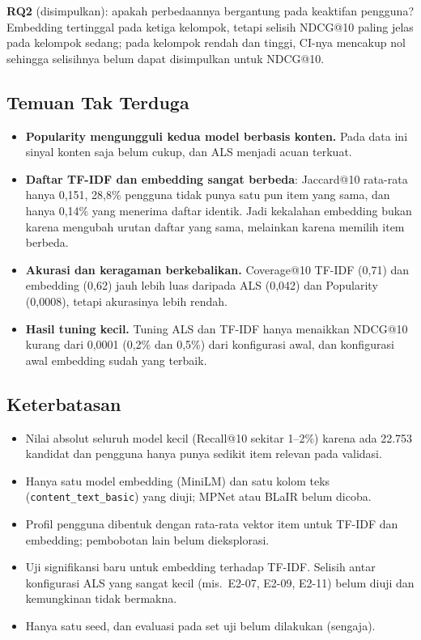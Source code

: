 \textbf{RQ2} (disimpulkan): apakah perbedaannya bergantung pada keaktifan
pengguna? Embedding tertinggal pada ketiga kelompok, tetapi selisih NDCG@10
paling jelas pada kelompok sedang; pada kelompok rendah dan tinggi, CI-nya
mencakup nol sehingga selisihnya belum dapat disimpulkan untuk NDCG@10.

\subsection{Temuan Tak Terduga}
\begin{itemize}
\item \textbf{Popularity mengungguli kedua model berbasis konten.} Pada data ini
  sinyal konten saja belum cukup, dan ALS menjadi acuan terkuat.
\item \textbf{Daftar TF-IDF dan embedding sangat berbeda}: Jaccard@10 rata-rata
  hanya 0,151, 28,8\% pengguna tidak punya satu pun item yang sama, dan hanya
  0,14\% yang menerima daftar identik. Jadi kekalahan embedding bukan karena
  mengubah urutan daftar yang sama, melainkan karena memilih item berbeda.
\item \textbf{Akurasi dan keragaman berkebalikan.} Coverage@10 TF-IDF (0,71)
  dan embedding (0,62) jauh lebih luas daripada ALS (0,042) dan Popularity
  (0,0008), tetapi akurasinya lebih rendah.
\item \textbf{Hasil tuning kecil.} Tuning ALS dan TF-IDF hanya menaikkan
  NDCG@10 kurang dari 0,0001 (0,2\% dan 0,5\%) dari konfigurasi awal, dan
  konfigurasi awal embedding sudah yang terbaik.
\end{itemize}

\subsection{Keterbatasan}
\begin{itemize}
\item Nilai absolut seluruh model kecil (Recall@10 sekitar 1--2\%) karena ada
  22.753 kandidat dan pengguna hanya punya sedikit item relevan pada validasi.
\item Hanya satu model embedding (MiniLM) dan satu kolom teks
  (\texttt{content\_text\_basic}) yang diuji; MPNet atau BLaIR belum dicoba.
\item Profil pengguna dibentuk dengan rata-rata vektor item untuk TF-IDF dan
  embedding; pembobotan lain belum dieksplorasi.
\item Uji signifikansi baru untuk embedding terhadap TF-IDF. Selisih antar
  konfigurasi ALS yang sangat kecil (mis.\ E2-07, E2-09, E2-11) belum diuji dan
  kemungkinan tidak bermakna.
\item Hanya satu seed, dan evaluasi pada set uji belum dilakukan (sengaja).
\end{itemize}

